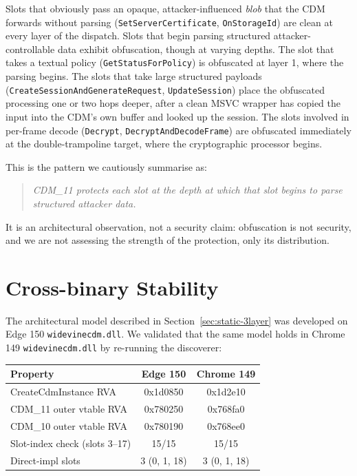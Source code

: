 \documentclass[11pt,letterpaper]{article}
\begin{document}
Slots that obviously pass an opaque, attacker-influenced \emph{blob}
that the CDM forwards without parsing
(\texttt{SetServerCertificate}, \texttt{OnStorageId}) are clean at
every layer of the dispatch. Slots that begin parsing structured
attacker-controllable data exhibit obfuscation, though at varying
depths. The slot that takes a textual policy
(\texttt{GetStatusForPolicy}) is obfuscated at layer 1, where the
parsing begins. The slots that take large structured payloads
(\texttt{CreateSessionAndGenerateRequest},
\texttt{UpdateSession}) place the obfuscated processing one or two
hops deeper, after a clean MSVC wrapper has copied the input into
the CDM's own buffer and looked up the session. The slots involved
in per-frame decode (\texttt{Decrypt},
\texttt{DecryptAndDecodeFrame}) are obfuscated immediately at the
double-trampoline target, where the cryptographic processor begins.

This is the pattern we cautiously summarise as:

\begin{quote}\itshape
CDM\_11 protects each slot at the depth at which that slot begins
to parse structured attacker data.
\end{quote}

\noindent It is an architectural observation, not a security claim:
obfuscation is not security, and we are not assessing the strength
of the protection, only its distribution.

\section{Cross-binary Stability}
\label{sec:cross}

The architectural model described in
Section~\ref{sec:static-3layer} was developed on Edge 150
\texttt{widevinecdm.dll}. We validated that the same model holds in
Chrome 149 \texttt{widevinecdm.dll} by re-running the discoverer:

\begin{center}\small
\begin{tabular}{lcc}
\toprule
\textbf{Property} & \textbf{Edge 150} & \textbf{Chrome 149} \\
\midrule
CreateCdmInstance RVA          & 0x1d0850 & 0x1d2e10 \\
CDM\_11 outer vtable RVA       & 0x780250 & 0x768fa0 \\
CDM\_10 outer vtable RVA       & 0x780190 & 0x768ee0 \\
Slot-index check (slots 3--17) & 15/15    & 15/15    \\
Direct-impl slots              & 3 (0, 1, 18) & 3 (0, 1, 18) \\
\bottomrule
\end{tabular}
\end{center}
\end{document}
